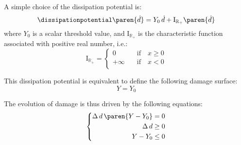 A simple choice of the dissipation potential is:
%
%
%
\begin{equation}
  \label{eq:micromorphicdamage:dissipationpotential}
  \begin{aligned}
    \dissipationpotential\paren{\dot{d}} = Y_{0}\,\dot{d}+ \mathrm{I}_{\mathbb{R}_{+}}\paren{\dot{d}} 
  \end{aligned}
\end{equation}
%
%
%
where $Y_0$ is a scalar threshold value, and $\mathrm{I}_{\mathbb{R}_{+}}$ is the characteristic function associated with positive real number, i.e.:
%
%
%
\begin{equation}
  \mathrm{I}_{\mathbb{R}_{+}}=
  \left\{
  \begin{aligned}
  0 &\quad\text{if}\quad x\geq 0 \\
  +\infty &\quad\text{if}\quad x< 0 \\
  \end{aligned}
  \right.
\end{equation}

This dissipation potential is equivalent to define the following damage surface:
%
%
%
\begin{equation}
  \label{eq:micromorphicdamage:yield}
  Y = Y_{0}
\end{equation}

The evolution of damage is thus driven by the following equations:
%
%
%
\begin{equation}
  \label{eq:micromorphicdamage:KTT}
  \left\{
  \begin{aligned}
  \Delta\,d\,\paren{Y - Y_{0}}&=0\\
  \Delta\,d&\geq 0\\
  Y - Y_{0}&\leq 0
  \end{aligned}
  \right.
\end{equation}


